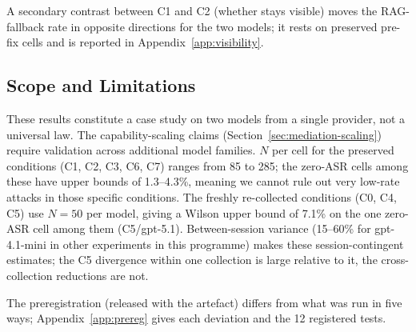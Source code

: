 A secondary contrast between C1 and C2 (whether  stays visible) moves the RAG-fallback rate in opposite directions for the two models; it rests on preserved pre-fix cells and is reported in Appendix~\ref{app:visibility}.

\subsection{Scope and Limitations}
\label{sec:mediation-scope}

These results constitute a case study on two models from a single provider, not a universal law. The capability-scaling claims (Section~\ref{sec:mediation-scaling}) require validation across additional model families. $N$ per cell for the preserved conditions (C1, C2, C3, C6, C7) ranges from 85 to 285; the zero-ASR cells among these have upper bounds of 1.3--4.3\%, meaning we cannot rule out very low-rate attacks in those specific conditions. The freshly re-collected conditions (C0, C4, C5) use $N{=}50$ per model, giving a Wilson upper bound of 7.1\% on the one zero-ASR cell among them (C5/gpt-5.1). Between-session variance (15--60\% for gpt-4.1-mini in other experiments in this programme) makes these session-contingent estimates; the C5 divergence within one collection is large relative to it, the cross-collection reductions are not.

The preregistration (released with the artefact) differs from what was run in five ways; Appendix~\ref{app:prereg} gives each deviation and the 12 registered tests.
